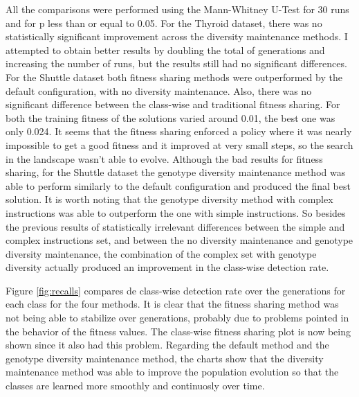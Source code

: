 \documentclass[journal]{IEEEtran}
\begin{document}
All the comparisons were performed using the Mann-Whitney U-Test for 30 runs and for p less than or equal to 0.05. For the Thyroid dataset, there was no statistically significant improvement across the diversity maintenance methods. I attempted to obtain better results by doubling the total of generations and increasing the number of runs, but the results still had no significant differences. For the Shuttle dataset both fitness sharing methods were outperformed by the default configuration, with no diversity maintenance. Also, there was no significant difference between the class-wise and traditional fitness sharing. For both the training fitness of the solutions varied around 0.01, the best one was only 0.024. It seems that the fitness sharing enforced a policy where it was nearly impossible to get a good fitness and it improved at very small steps, so the search in the landscape wasn't able to evolve. Although the bad results for fitness sharing, for the Shuttle dataset the genotype diversity maintenance method was able to perform similarly to the default configuration and produced the final best solution. It is worth noting that the genotype diversity method with complex instructions was able to outperform the one with simple instructions. So besides the previous results of statistically irrelevant differences between the simple and complex instructions set, and between the no diversity maintenance and genotype diversity maintenance, the combination of the complex set with genotype diversity actually produced an improvement in the class-wise detection rate.

Figure \ref{fig:recalls} compares de class-wise detection rate over the generations for each class for the four methods. It is clear that the fitness sharing method was not being able to stabilize over generations, probably due to problems pointed in the behavior of the fitness values. The class-wise fitness sharing plot is now being shown since it also had this problem.  Regarding the default method and the genotype diversity maintenance method, the charts show that the diversity maintenance method was able to improve the population evolution so that the classes are learned more smoothly and continuosly over time.
\end{document}
